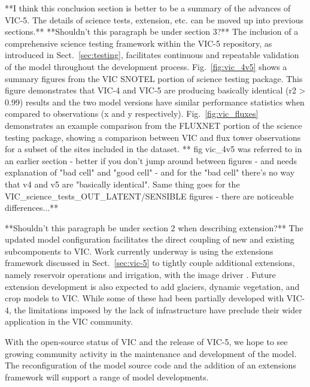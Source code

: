 \documentclass[gmd, manuscript]{copernicus}
\begin{document}
\conclusions[Conclusions]
\label{sec:conclusions}
  **I think this conclusion section is better to be a summary of the advances of VIC-5. The details of science tests, extension, etc. can be moved up into previous sections.**
  **Shouldn't this paragraph be under section 3?**
  The inclusion of a comprehensive science testing framework within the VIC-5 repository, as introduced in Sect.~\ref{sec:testing}, facilitates continuous and repeatable validation of the model throughout the development process. Fig.~\ref{fig:vic_4v5} shows a summary figures from the VIC SNOTEL portion of science testing package. This figure demonstrates that VIC-4 and VIC-5 are producing basically identical (r2 > 0.99) results and the two model versions have similar performance statistics when compared to observations (x and y respectively). Fig.~\ref{fig:vic_fluxes} demonstrates an example comparison from the FLUXNET portion of the science testing package, showing a comparison between VIC and flux tower observations for a subset of the sites included in the dataset.  ** fig vic_4v5 was referred to in an earlier section - better if you don't jump around between figures - and needs explanation of "bad cell" and "good cell" - and for the "bad cell" there's no way that v4 and v5 are "basically identical".  Same thing goes for the VIC_science_tests_OUT_LATENT/SENSIBLE figures - there are noticeable differences...**

  **Shouldn't this paragraph be under section 2 when describing extension?**
  The updated model configuration facilitates the direct coupling of new and existing subcomponents to VIC. Work currently underway is using the extensions framework discussed in Sect.~\ref{sec:vic-5} to tightly couple additional extensions, namely reservoir operations and irrigation, with the image driver \citep{Hamman_2017a}. Future extension development is also expected to add glaciers, dynamic vegetation, and crop models to VIC. While some of these had been partially developed with VIC-4, the limitations imposed by the lack of infrastructure have preclude their wider application in the VIC community.

  With the open-source status of VIC and the release of VIC-5, we hope to see growing community activity in the maintenance and development of the model. The reconfiguration of the model source code and the addition of an extensions framework will support a range of model developments.
\end{document}
